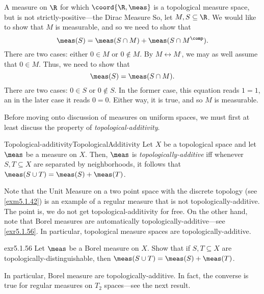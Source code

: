 \begin{exm}{A measure on $\R$ for which $\coord{\R ,\meas}$ is a topological measure space, but is not strictly-positive---the Dirac Measure}{}
So, let $M,S\subseteq \R$.  We would like to show that $M$ is measurable, and so we need to show that
\begin{equation}
\meas (S)=\meas (S\cap M)+\meas (S\cap M^{\comp}).
\end{equation}
There are two cases:  either $0\in M$ or $0\notin M$.  By $M\leftrightarrow M^{\comp}$, we may as well assume that $0\in M$.  Thus, we need to show that
\begin{equation}
\meas (S)=\meas (S\cap M).
\end{equation}
There are two cases:  $0\in S$ or $0\notin S$.  In the former case, this equation reads $1=1$, an in the later case it reads $0=0$.  Either way, it is true, and so $M$ is measurable.
\end{exm}

Before moving onto discussion of measures on uniform spaces, we must first at least discuss the property of \emph{topological-additivity}.
\begin{dfn}{Topological-additivity}{TopologicalAdditivity}
Let $X$ be a topological space and let $\meas$ be a measure on $X$.  Then, $\meas$ is \emph{topologically-additive} iff whenever $S,T\subseteq X$ are separated by neighborhoods, it follows that $\meas (S\cup T)=\meas (S)+\meas (T)$.
\begin{rmk}
Note that the Unit Measure on a two point space with the discrete topology (see \cref{exm5.1.42}) is an example of a regular measure that is not topologically-additive.  The point is, we do not get topological-additivity for free.  On the other hand, note that Borel measures are automatically topologically-additive---see \cref{exr5.1.56}.  In particular, topological measure spaces are topologically-additive.
\end{rmk}
\end{dfn}
\begin{exr}{}{exr5.1.56}
Let $\meas$ be a Borel measure on $X$.  Show that if $S,T\subseteq X$ are topologically-distinguishable, then $\meas (S\cup T)=\meas (S)+\meas (T)$.
\begin{rmk}
In particular, Borel measure are topologically-additive.  In fact, the converse is true for regular measures on $T_2$ spaces---see the next result.
\end{rmk}
\end{exr}

